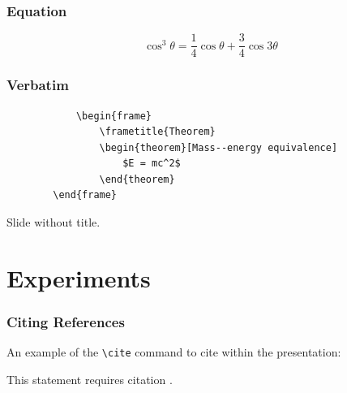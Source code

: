\documentclass[
	11pt, %
	aspectratio=169, %
]{beamer}
\begin{document}

\begin{frame}
	\frametitle{Equation}

	\begin{equation}
		\cos^3 \theta =\frac{1}{4}\cos\theta+\frac{3}{4}\cos 3\theta
	\end{equation}
\end{frame}


\begin{frame}[fragile] %
	\frametitle{Verbatim}
	
	\begin{example}
		\begin{verbatim}
			\begin{frame}
				\frametitle{Theorem}
				\begin{theorem}[Mass--energy equivalence]
					$E = mc^2$
				\end{theorem}
		\end{frame}\end{verbatim} %
	\end{example}
\end{frame}


\begin{frame}
	Slide without title.
\end{frame}


\section{Experiments}

\begin{frame}
	\frametitle{Citing References}
	
	An example of the \texttt{\textbackslash cite} command to cite within the presentation:
	
	\bigskip %
	
	This statement requires citation \cite{p2}.
\end{frame}

\end{document}
